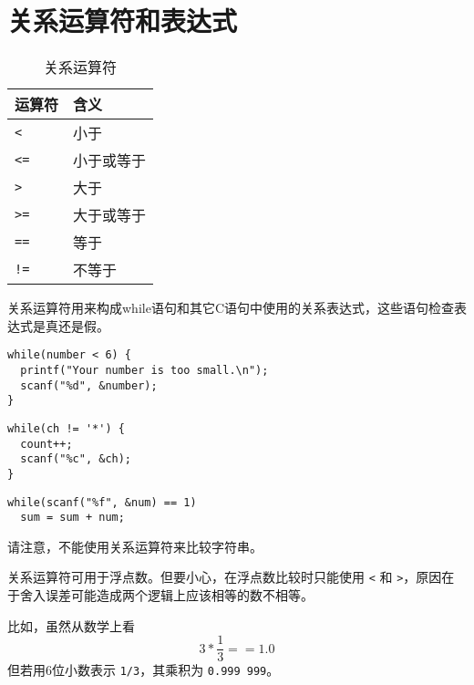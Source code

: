 \section{关系运算符和表达式}

\begin{frame}[fragile]\ft{\secname}
\begin{table}
\centering
\caption{关系运算符}
\begin{tabular}{p{2cm}|p{3cm}}\hline
运算符& 含义\\\hline\hline
\lstinline|<|  & 小于\\[0.1in]
\lstinline|<=| & 小于或等于\\[0.1in]
\lstinline|>|  & 大于\\[0.1in]
\lstinline|>=| & 大于或等于\\[0.1in]
\lstinline|==| & 等于\\[0.1in]
\lstinline|!=| & 不等于\\\hline
\end{tabular}
\end{table}
\end{frame}

\begin{frame}[fragile]\ft{\secname}
关系运算符用来构成while语句和其它C语句中使用的关系表达式，这些语句检查表达式是真还是假。
\end{frame}

\begin{frame}[fragile]\ft{\secname}
\begin{lstlisting}
while(number < 6) {
  printf("Your number is too small.\n");
  scanf("%d", &number);
}
\end{lstlisting}
\begin{lstlisting}
while(ch != '*') {
  count++;
  scanf("%c", &ch);  
}
\end{lstlisting}

\begin{lstlisting}
while(scanf("%f", &num) == 1)
  sum = sum + num;
\end{lstlisting}

\end{frame}

\begin{frame}[fragile]\ft{\secname}
请注意，不能使用关系运算符来比较字符串。
\end{frame}

\begin{frame}[fragile]\ft{\secname}
关系运算符可用于浮点数。但要小心，在浮点数比较时只能使用 \lstinline|<| 和 \lstinline|>|，原因在于舍入误差可能造成两个逻辑上应该相等的数不相等。\vspace{0.1in}

比如，虽然从数学上看
$$
3*\frac13==1.0
$$
但若用6位小数表示 \lstinline|1/3|，其乘积为 \lstinline|0.999 999|。
\end{frame}

